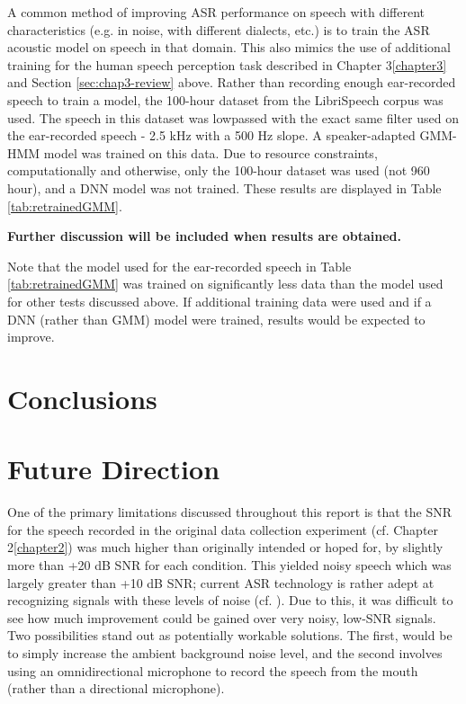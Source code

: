 A common method of improving ASR performance on speech with different characteristics (e.g. in noise, with different dialects, etc.) is to train the ASR acoustic model on speech in that domain.  This also mimics the use of additional training for the human speech perception task described in Chapter 3\ref{chapter3} and Section \ref{sec:chap3-review} above.  Rather than recording enough ear-recorded speech to train a model, the 100-hour dataset from the LibriSpeech corpus was used.  The speech in this dataset was lowpassed with the exact same filter used on the ear-recorded speech - 2.5 kHz with a 500 Hz slope.  A speaker-adapted GMM-HMM model was trained on this data.  Due to resource constraints, computationally and otherwise, only the 100-hour dataset was used (not 960 hour), and a DNN model was not trained.  These results are displayed in Table \ref{tab:retrainedGMM}.

% 

\textbf{Further discussion will be included when results are obtained.}

Note that the model used for the ear-recorded speech in Table \ref{tab:retrainedGMM} was trained on significantly less data than the model used for other tests discussed above.  If additional training data were used and if a DNN (rather than GMM) model were trained, results would be expected to improve.


\section{Conclusions}



\section{Future Direction}

One of the primary limitations discussed throughout this report is that the SNR for the speech recorded in the original data collection experiment (cf. Chapter 2\ref{chapter2}) was much higher than originally intended or hoped for, by slightly more than +20 dB SNR for each condition.  This yielded noisy speech which was largely greater than +10 dB SNR; current ASR technology is rather adept at recognizing signals with these levels of noise (cf. \cite{braun:16}).  Due to this, it was difficult to see how much improvement could be gained over very noisy, low-SNR signals.  Two possibilities stand out as potentially workable solutions.  The first, would be to simply increase the ambient background noise level, and the second involves using an omnidirectional microphone to record the speech from the mouth (rather than a directional microphone).  

